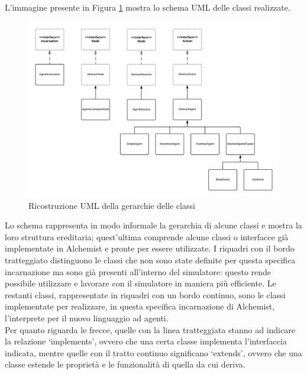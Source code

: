 L'immagine presente in Figura \ref{fig:UMLGerarchiaClassi} mostra lo schema UML delle classi realizzate.
\begin{figure}[h] %
\includegraphics[width=15cm]{images/UML_agenti.png} %
\caption[Ricostruzione UML della gerarchia delle classi]{Ricostruzione UML della gerarchie delle classi} \label{fig:UMLGerarchiaClassi}
\end{figure}

Lo schema rappresenta in modo informale la gerarchia di alcune classi e mostra la loro struttura ereditaria; quest'ultima comprende alcune classi o interfacce già implementate in Alchemist e pronte per essere utilizzate. I riquadri con il bordo tratteggiato distinguono le classi che non sono state definite per questa specifica incarnazione ma sono già presenti all'interno del simulatore: questo rende possibile utilizzare e lavorare con il simulatore in maniera più efficiente. Le restanti classi, rappresentate in riquadri con un bordo continuo, sono le classi implementate per realizzare, in questa specifica incarnazione di Alchemist, l'interprete per il nuovo linguaggio ad agenti.
\\
Per quanto riguarda le frecce, quelle con la linea tratteggiata stanno ad indicare la relazione `implements', ovvero che una certa classe implementa l'interfaccia indicata, mentre quelle con il tratto continuo significano `extends', ovvero che una classe estende le proprietà e le funzionalità di quella da cui deriva.

